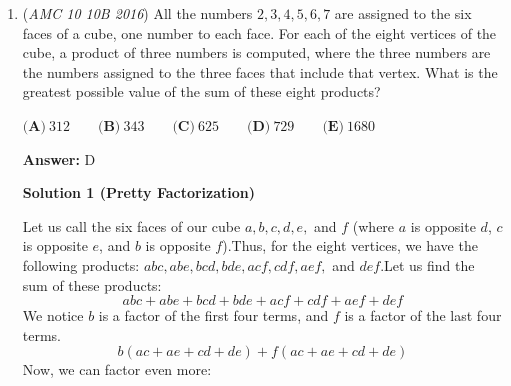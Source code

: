 \begin{enumerate}
 Let $f^{'}(a)=\frac{2a^2-2a-a^2}{(a-1)^2}=\frac{a(a-2)}{(a-1)^2}=0.$ We solve that $a=2.$

 It's easy to find that when $1<a<2, f^{'}(a)<0,$ when $a>2, f^{'}(a)>0.$ Thus $f(a)$ has a minimum value when $a=2.$, which is $f(2)=4.$ Choose  $\boxed{\textbf{(E)}\ 4}.$




\textbf{Solution 7}

As seen in Solution 1, you can express the geometrical series as
 \[\begin{split}  S & =\frac{1}{r-r^2}  \end{split}\]

 If you find the vertex of $r-r^2$, that number corresponds to the lowest value of $S$. Changing $r-r^2$ to vertex form:
 \[\begin{split}  y & =r-r^2 \\ -y & =r^2-r \\ \frac{1}{4}-y & =r^2-r+\frac{1}{4} \\ \frac{1}{4}-y & =(r-\frac{1}{2})^2 \\ -y & =(r-\frac{1}{2})^2-\frac{1}{4} \\ y & =-(r-\frac{1}{2})^2+\frac{1}{4} \end{split}\]

 Since the end of the equation is $\frac{1}{4}$, therefore the highest(since the the parentheses with $r$ is negative) y-coordinate of $r-r^2$ is $\frac{1}{4}$. From here plug it into $\frac{1}{r-r^2}$ to get that the smallest value of $S$ is $\boxed{\textbf{(E)}\ 4}.$



	\item (\textit{AMC 10 10B 2016}) All the numbers $2, 3, 4, 5, 6, 7$ are assigned to the six faces of a cube, one number to each face. For each of the eight vertices of the cube, a product of three numbers is computed, where the three numbers are the numbers assigned to the three faces that include that vertex. What is the greatest possible value of the sum of these eight products?


 $\textbf{(A)}\ 312 \qquad \textbf{(B)}\ 343 \qquad \textbf{(C)}\ 625 \qquad \textbf{(D)}\ 729 \qquad \textbf{(E)}\ 1680$

 \textbf{Answer: }D



\textbf{Solution 1 (Pretty Factorization)}

Let us call the six faces of our cube $a,b,c,d,e,$ and $f$ (where $a$ is opposite $d$, $c$ is opposite $e$, and $b$ is opposite $f$).Thus, for the eight vertices, we have the following products: $abc,abe,bcd,bde,acf,cdf,aef,$ and $def$.Let us find the sum of these products:
 \[abc+abe+bcd+bde+acf+cdf+aef+def\]We notice $b$ is a factor of the first four terms, and $f$ is a factor of the last four terms.
 \[b(ac+ae+cd+de)+f(ac+ae+cd+de)\]Now, we can factor even more:


\end{enumerate}
